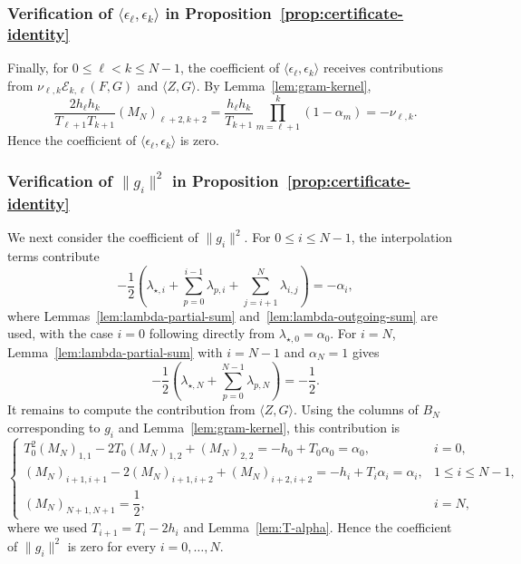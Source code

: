 \documentclass[11pt, hidelinks]{article}
\begin{document}
\subsubsection{Verification of $\langle\epsilon_\ell,\epsilon_k\rangle$ in Proposition~\ref{prop:certificate-identity}}
Finally, for $0\le\ell<k\le N-1$, the coefficient of $\langle\epsilon_\ell,\epsilon_k\rangle$ receives contributions from $\nu_{\ell,k}\mathcal E_{k,\ell}(F,G)$ and $\langle Z,G\rangle$. By Lemma~\ref{lem:gram-kernel},
\[ \frac{2h_\ell h_k}{T_{\ell+1}T_{k+1}} (M_N)_{\ell+2,k+2}
= \frac{h_\ell h_k}{T_{k+1}} \prod_{m=\ell+1}^{k}(1-\alpha_m) =-\nu_{\ell,k}. \]
Hence the coefficient of $\langle\epsilon_\ell,\epsilon_k\rangle$ is zero.

\subsubsection{Verification of $\|g_i\|^2$ in Proposition~\ref{prop:certificate-identity}}
We next consider the coefficient of $\|g_i\|^2$. For $0\le i\le N-1$, the interpolation terms contribute
\[
-\frac12\left(\lambda_{\star,i}+\sum_{p=0}^{i-1}\lambda_{p,i}+\sum_{j=i+1}^{N}\lambda_{i,j}\right)=-\alpha_i,
\]
where Lemmas~\ref{lem:lambda-partial-sum} and~\ref{lem:lambda-outgoing-sum} are used, with the case $i=0$ following directly from $\lambda_{\star,0}=\alpha_0$. For $i=N$, Lemma~\ref{lem:lambda-partial-sum} with $i=N-1$ and $\alpha_N=1$ gives
\[
-\frac12\left(\lambda_{\star,N}+\sum_{p=0}^{N-1}\lambda_{p,N}\right)=-\frac12.
\]
It remains to compute the contribution from $\langle Z,G\rangle$. Using the columns of $B_N$ corresponding to $g_i$ and Lemma~\ref{lem:gram-kernel}, this contribution is
\[
\begin{cases}
T_0^2(M_N)_{1,1}-2T_0(M_N)_{1,2}+(M_N)_{2,2}
=-h_0+T_0\alpha_0=\alpha_0,&i=0,\\[0.4em]
(M_N)_{i+1,i+1}-2(M_N)_{i+1,i+2}+(M_N)_{i+2,i+2}
=-h_i+T_i\alpha_i=\alpha_i,&1\le i\le N-1,\\[0.4em]
(M_N)_{N+1,N+1}=\dfrac12,&i=N,
\end{cases}\]
where we used $T_{i+1}=T_i-2h_i$ and Lemma~\ref{lem:T-alpha}. Hence the coefficient of $\|g_i\|^2$ is zero for every $i=0,\ldots,N$.
\end{document}
